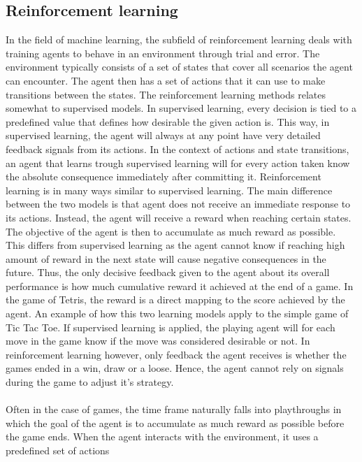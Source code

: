 \subsection{Reinforcement learning \label{RL}}

In the field of machine learning, the subfield of reinforcement learning
deals with training agents to behave in an environment through
trial and error. The environment typically consists of a set of states that cover all
scenarios the agent can encounter. The agent then has a set of actions
that it can use to make transitions between the states. 
The reinforcement learning methods relates somewhat 
to supervised models.
In supervised learning, every decision is tied to a predefined value
that defines how desirable the given action is. This way, in supervised learning,
the agent will always at any point have very detailed feedback signals from its actions.
In the context of actions and state transitions, an agent that learns trough
supervised learning will for every action taken know the absolute consequence
immediately after committing it.
Reinforcement learning is in many ways similar to supervised learning. 
The main difference between the two models is that agent does not receive 
an immediate response to its actions. Instead, the agent will receive a reward
when reaching certain states. The objective of the agent is then to
accumulate as much reward as possible. This differs from supervised learning
as the agent cannot know if reaching high amount of reward in the next state
will cause negative consequences in the future. Thus, the only decisive 
feedback given to the agent about its overall performance is 
how much cumulative reward it achieved at the end of a game.
In the game of Tetris, the reward is a direct mapping to 
the score achieved by the agent.
An example of how this two learning models apply to the simple game of
Tic Tac Toe. If supervised learning
is applied, the playing agent will for each move in the game know
if the move was considered desirable or not. 
In reinforcement learning however, only feedback the agent receives
is whether the games ended in a win, draw or a loose. Hence, the agent
cannot rely on signals during the game to adjust it's strategy.\\
\\
Often in the case of games, the 
time frame naturally falls into playthroughs in which the 
goal of the agent is to accumulate as much reward as possible 
before the game ends.
When the agent interacts 
with the environment, it uses a predefined set of actions
